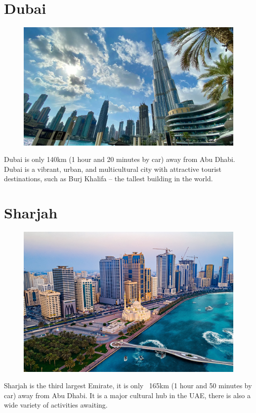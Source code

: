 \section{Dubai}
\begin{figure}[h!]
 \centering
     \includegraphics[width=0.9\linewidth]{examples/handbook_coling25/local_guide/images/dubai.png}
\end{figure}
Dubai is only 140km (1 hour and 20 minutes by car) away from Abu Dhabi.
 Dubai is a vibrant, urban, and multicultural city with attractive tourist destinations, such as Burj Khalifa – the tallest building in the world.\\

\section{Sharjah}
\begin{figure}[h!]
 \centering
     \includegraphics[width=0.9\linewidth]{examples/handbook_coling25/local_guide/images/sharjah.png}
\end{figure}

Sharjah is the third largest Emirate, it is only ~165km (1 hour and 50 minutes by car) away from Abu Dhabi.
 It is a major cultural hub in the UAE, there is also a wide variety of activities awaiting. 
